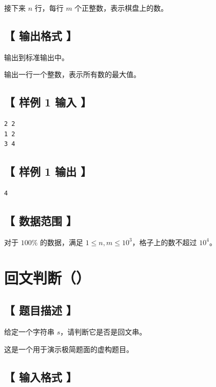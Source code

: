 \documentclass{statement}
\begin{document}
接下来 $n$ 行，每行 $m$ 个正整数，表示棋盘上的数。


\subsection[ 输出格式 ]{【 输出格式 】}

输出到标准输出中。

输出一行一个整数，表示所有数的最大值。


\subsection[ 样例 1 输入 ]{【 样例 1 输入 】}

\begin{verbatim}
2 2
1 2
3 4
\end{verbatim}


\subsection[ 样例 1 输出 ]{【 样例 1 输出 】}

\begin{verbatim}
4
\end{verbatim}


\subsection[ 数据范围 ]{【 数据范围 】}

对于 $100\%$ 的数据，满足 $1 \le n, m \le 10^3$，格子上的数不超过 $10^4$。



\newpage

\section{ 回文判断（）}

\subsection[ 题目描述 ]{【 题目描述 】}

给定一个字符串 $s$，请判断它是否是回文串。

这是一个用于演示极简题面的虚构题目。


\subsection[ 输入格式 ]{【 输入格式 】}
\end{document}
